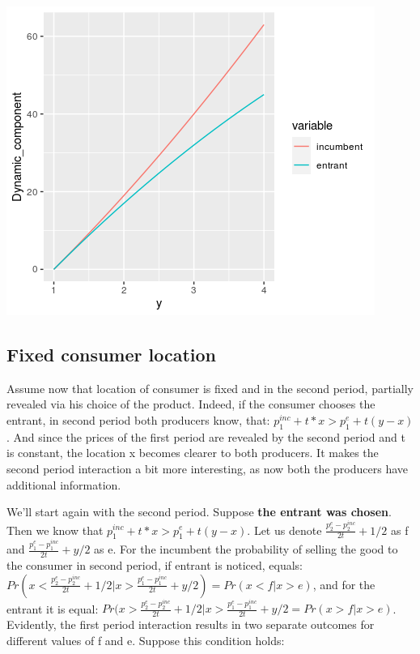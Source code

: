 \documentclass{article}
\begin{document}
\begin{center}
    \includegraphics[scale=0.5]{dynamiccomponent.png}
\end{center}



\subsection{Fixed consumer location}

Assume now that location of consumer is fixed and in the second period, partially revealed via his choice of the product. Indeed, if the consumer chooses the entrant, in second period both producers know, that:
$p_1^{inc}+t*x>p_1^{e}+t(y-x)$. And since the prices of the first period are revealed by the second period and t is constant, the location x becomes clearer to both producers. It makes the second period interaction a bit more interesting, as now both the producers have additional information. 

We'll start again with the second period. Suppose \textbf{the entrant was chosen}. Then we know that $p_1^{inc}+t*x>p_1^{e}+t(y-x)$. Let us denote $ \frac{p_2^{e}-p_2^{inc}}{2t}+1/2$ as f and $\frac{p_1^{e}-p_1^{inc}}{2t}+y/2$ as e. For the incumbent the probability of selling the good to the consumer in second period, if entrant is noticed, equals: $Pr(x<\frac{p_2^{e}-p_2^{inc}}{2t}+1/2 | x > \frac{p_1^{e}-p_1^{inc}}{2t}+y/2) = Pr(x<f|x>e)$, and for the entrant it is equal: $ Pr(x>\frac{p_2^{e}-p_2^{inc}}{2t}+1/2 | x >\frac{p_1^{e}-p_1^{inc}}{2t}+y/2 = Pr(x>f|x>e)$.
Evidently, the first period interaction results in two separate outcomes for different values of f and e. Suppose this condition holds:
\end{document}

